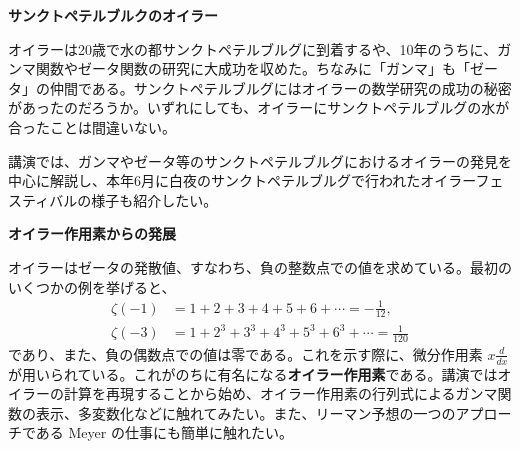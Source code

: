 \documentclass[uplatex,dvipdfmx]{jlreq}
\begin{document}
\vfill

\newpage

\begin{center}
{\large\bfseries サンクトペテルブルクのオイラー}\\[6pt]
\hspace*{\fill}{\large\bfseries 黒川　信重（東京工業大学・理工学研究科）}
\end{center}

オイラーは20歳で水の都サンクトペテルブルグに到着するや、10年のうちに、ガンマ関数やゼータ関数の研究に大成功を収めた。ちなみに「ガンマ」も「ゼータ」の仲間である。サンクトペテルブルグにはオイラーの数学研究の成功の秘密があったのだろうか。いずれにしても、オイラーにサンクトペテルブルグの水が合ったことは間違いない。

講演では、ガンマやゼータ等のサンクトペテルブルグにおけるオイラーの発見を中心に解説し、本年6月に白夜のサンクトペテルブルグで行われたオイラーフェスティバルの様子も紹介したい。

\newpage

\begin{center}
{\large\bfseries オイラー作用素からの発展}\\[6pt]
\hspace*{\fill}{\large\bfseries 落合　啓之（名古屋大学・多元数理科学研究科）}
\end{center}

オイラーはゼータの発散値、すなわち、負の整数点での値を求めている。最初のいくつかの例を挙げると、
\begin{align*}
\zeta(-1) &= 1+2+3+4+5+6+\cdots = -\frac{1}{12}, \\
\zeta(-3) &= 1+2^3+3^3+4^3+5^3+6^3+\cdots = \frac{1}{120}
\end{align*}
であり、また、負の偶数点での値は零である。これを示す際に、微分作用素 $x \frac{d}{dx}$ が用いられている。これがのちに有名になる\textbf{オイラー作用素}である。講演ではオイラーの計算を再現することから始め、オイラー作用素の行列式によるガンマ関数の表示、多変数化などに触れてみたい。また、リーマン予想の一つのアプローチである Meyer の仕事にも簡単に触れたい。
\end{document}
